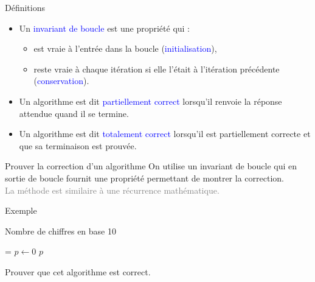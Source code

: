 \documentclass[10pt,french]{beamer}
\begin{document}
\begin{frame}[fragile]{\Ctitle}{\stitle}
	\begin{block}{Définitions}
		\begin{itemize}
			\item<1-> Un \textcolor{blue}{invariant de boucle} est une propriété qui :
				\begin{itemize}
					\item<2-> est vraie à l'entrée dans la boucle (\textcolor{blue}{initialisation}),
					\item<3-> reste vraie à chaque itération si elle l'était à l'itération précédente (\textcolor{blue}{conservation}).
				\end{itemize}
			\item<4-> Un algorithme est dit \textcolor{blue}{partiellement correct} lorsqu'il renvoie la réponse attendue quand il se termine.
			\item<5-> Un algorithme est dit \textcolor{blue}{totalement correct} lorsqu'il est partiellement correcte et que sa terminaison est prouvée.
		\end{itemize}
	\end{block}
	{\begin{alertblock}{\textcolor{yellow}{\important \;} Prouver la correction d'un algorithme}
			On utilise un invariant de boucle qui en sortie de boucle fournit une propriété permettant de montrer la correction.\\
			\textcolor{gray}{La méthode est similaire à une récurrence mathématique.}
		\end{alertblock}}
\end{frame}


\begin{frame}[fragile]{\Ctitle}{\stitle}
	\begin{exampleblock}{Exemple}
		\SetAlFnt{\small}
		\setlength{\algomargin}{8pt}
		\begin{algorithm}[H]
			\DontPrintSemicolon
			\caption{Nombre de chiffres en base 10}
			\everypar={\footnotesize \textcolor{gray}{\nl}}
			$p \leftarrow 0$\;
			\Return $p$
		\end{algorithm}
		Prouver que cet algorithme est correct.
	\end{exampleblock}
\end{frame}
\end{document}
